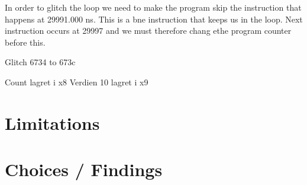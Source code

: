 In order to glitch the loop we need to make the program skip the instruction that happens at 29991.000 ns. This is a bne instruction that keeps us in the loop. Next instruction occurs at 29997 and we must therefore chang ethe program counter before this. 

Glitch 6734 to 673c

Count lagret i x8 
Verdien 10 lagret i x9

\section{Limitations}
\label{sec:limit}

\section{Choices / Findings}
\label{sec:choice}